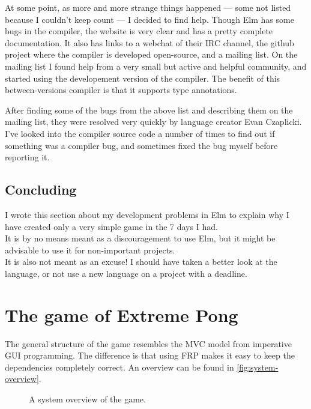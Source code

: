 \documentclass[a4paper]{article}
\begin{document}
At some point, as more and more strange things happened --- some not listed
 because I couldn't keep count --- I decided to find help. Though Elm has some
 bugs in the compiler, the website is very clear and has a pretty complete
 documentation. It also has links to a webchat of their IRC channel, the github
 project where the compiler is developed open-source, and a mailing list.
 On the mailing list I found help from a very small but active and helpful
 community, and started using the developement version of the compiler. The
 benefit of this between-versions compiler is that it supports type annotations.

After finding some of the bugs from the above list and describing them on the
 mailing list, they were resolved very quickly by language creator Evan
 Czaplicki. I've looked into the compiler source code a number of times to find
 out if something was a compiler bug, and sometimes fixed the bug myself before
 reporting it.

\subsection{Concluding}
I wrote this section about my development problems in Elm to explain why I have
 created only a very simple game in the 7 days I had. \\
It is by no means meant as a discouragement to use Elm, but it might be
 advisable to use it for non-important projects. \\
It is also not meant as an excuse! I should have taken a better look at the
 language, or not use a new language on a project with a deadline. 

\section{The game of Extreme Pong}

The general structure of the game resembles the MVC model from imperative GUI
 programming. The difference is that using FRP makes it easy to keep the
 dependencies completely correct. An overview can be found in
 \autoref{fig:system-overview}. 

\begin{figure}[h]
\centering
\setlength\fboxsep{0pt}
\setlength\fboxrule{1pt}
\caption{A system overview of the game. }
\label{fig:system-overview}
\end{figure}
\end{document}
